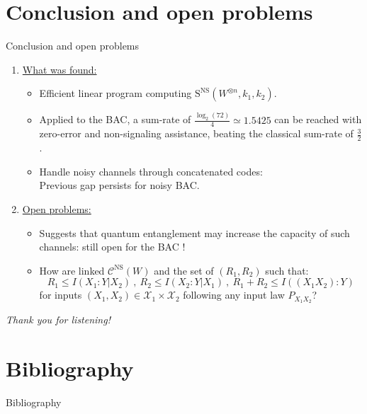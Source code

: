 \documentclass{beamer}
\theoremstyle{definition}
\theoremstyle{remark}
\begin{document}
\section{Conclusion and open problems}
\begin{frame}{Conclusion and open problems}
  \begin{enumerate}
    \item \underline{What was found:}
      \begin{itemize}
      \item Efficient linear program computing $\mathrm{S}^{\mathrm{NS}}(W^{\otimes n},k_1,k_2)$.
        \pause
      \item Applied to the BAC, a sum-rate of $\frac{\log_2(72)}{4} \simeq 1.5425$ can be reached with zero-error and non-signaling assistance, beating the classical sum-rate of $\frac{3}{2}$.
        \pause
      \item Handle noisy channels through concatenated codes:\\
        Previous gap persists for noisy BAC.
      \end{itemize}
      \pause
      \bigskip
      \item \underline{Open problems:}
        \begin{itemize}
  \item Suggests that quantum entanglement may increase the capacity of such channels: still open for the BAC !
    \pause
  \item How are linked $\mathcal{C}^{\mathrm{NS}}(W)$ and the set of $(R_1,R_2)$ such that:
  \[ R_1 \leq I(X_1:Y|X_2)\ ,\ R_2 \leq I(X_2:Y|X_1)\ ,\ R_1+R_2 \leq I((X_1X_2):Y)\]
  for inputs $(X_1,X_2) \in \mathcal{X}_1 \times \mathcal{X}_2$ following \alert{any input law $P_{X_1X_2}$}?
        \end{itemize}
  \end{enumerate}
\end{frame}

\begin{frame}
  \begin{center}
    \emph{\huge{Thank you for listening!}}
    \end{center}
\end{frame}

\section{Bibliography}
\begin{frame}[allowframebreaks]{Bibliography}
  
  
\end{frame}

\end{document}
